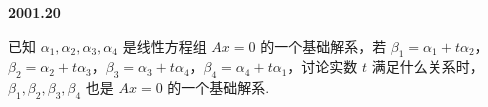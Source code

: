\documentclass[UTF8,12pt,fontset=windows]{ctexart}
\begin{document}
\vfill
\newpage
{\large\bfseries 2001.20}

已知 $\alpha_1, \alpha_2, \alpha_3, \alpha_4$ 是线性方程组 $Ax = 0$ 的一个基础解系，若 $\beta_1 = \alpha_1 + t\alpha_2$，$\beta_2 = \alpha_2 + t\alpha_3$，$\beta_3 = \alpha_3 + t\alpha_4$，$\beta_4 = \alpha_4 + t\alpha_1$，讨论实数 $t$ 满足什么关系时，$\beta_1, \beta_2, \beta_3, \beta_4$ 也是 $Ax = 0$ 的一个基础解系.

\vfill
\end{document}
